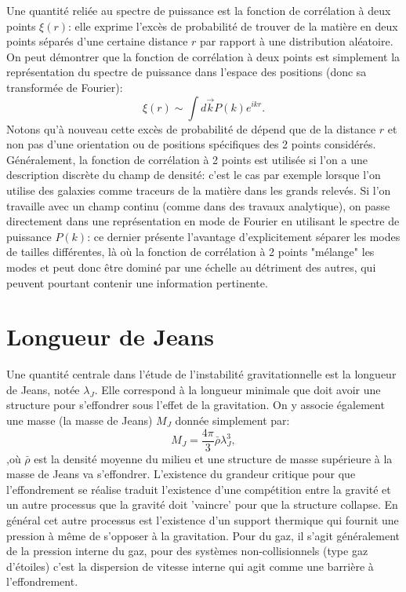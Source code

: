 Une quantité reliée au spectre de puissance est la fonction de corrélation à deux points $\xi (r)$: elle exprime l'excès de probabilité de trouver de la matière en deux points séparés d'une certaine distance $r$ par rapport à une distribution aléatoire. On peut démontrer que la fonction de corrélation à deux points est simplement la représentation du spectre de puissance dans l'espace des positions (donc sa transformée de Fourier):
\begin{equation}
\xi (r)\sim \int d\vec k P(k) e^{i k r}.
\end{equation}
Notons qu'à nouveau cette excès de probabilité de dépend que de la distance $r$ et non pas d'une orientation ou de positions spécifiques des 2 points considérés. Généralement, la fonction de corrélation à 2 points est utilisée si l'on a une description discrète du champ de densité: c'est le cas par exemple lorsque l'on utilise des galaxies comme traceurs de la matière dans les grands relevés. Si l'on travaille avec un champ continu (comme dans des travaux analytique), on passe directement dans une représentation en mode de Fourier en utilisant le spectre de puissance $P(k)$: ce dernier présente l'avantage d'explicitement séparer les modes de tailles différentes, là où la fonction de corrélation à 2 points "mélange" les modes et peut donc être dominé par une échelle au détriment des autres, qui peuvent pourtant contenir une information pertinente.

\section{Longueur de Jeans}
Une quantité centrale dans l'étude de l'instabilité gravitationnelle est la longueur de Jeans, notée $\lambda_J$. Elle correspond à la longueur minimale  que doit avoir une structure pour s'effondrer sous l'effet de la gravitation. On y associe également une masse (la masse de Jeans) $M_J$ donnée simplement par:
\begin{equation}
M_J=\frac{4\pi}{3}\bar\rho\lambda_J^3,
\end{equation}
,où $\bar \rho$ est la densité moyenne du milieu et une structure de masse supérieure à la masse de Jeans va s'effondrer. L'existence du grandeur critique pour que l'effondrement se réalise traduit l'existence d'une compétition entre la gravité et un autre processus que la gravité doit 'vaincre' pour que la structure collapse. En général cet autre processus est l'existence d'un support thermique qui fournit une pression à même de s'opposer à la gravitation. Pour du gaz, il s'agit généralement de la pression interne du gaz, pour des systèmes non-collisionnels (type gaz d'étoiles) c'est la dispersion de vitesse interne qui agit comme une barrière à l'effondrement.

